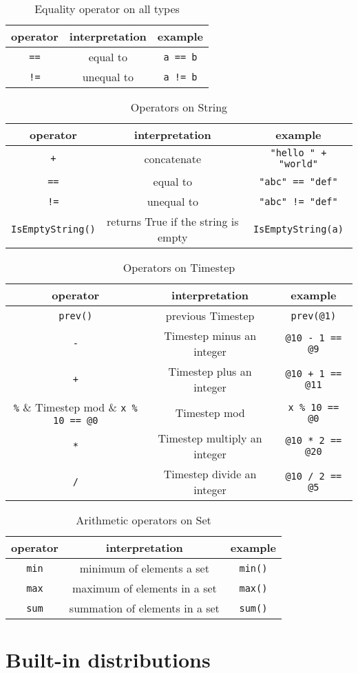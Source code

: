 \documentclass[12pt]{article}
\begin{document}
\begin{table}[H]
\centering
\caption{Equality operator on all types}
\begin{tabular}{ c c c }
\toprule 
operator & interpretation & example \\
\midrule
{\tt ==} & equal to & \verb|a == b|   \\ 
{\tt !=} & unequal to & \verb|a != b|  \\ 
\bottomrule
\end{tabular}
\end{table}

\begin{table}[H]
\centering
\caption{Operators on String}
\begin{tabular}{ c c c }
\toprule 
operator & interpretation & example \\
\midrule
{\tt +} & concatenate & \verb|"hello " + "world"|  \\ 
{\tt ==} & equal to & \verb|"abc" == "def"|  \\
{\tt !=} & unequal to & \verb|"abc" != "def"|\\ 
\verb|IsEmptyString()| & returns True if the string is empty & \verb|IsEmptyString(a)| \\
\bottomrule
\end{tabular}
\end{table}

\begin{table}[H]
\centering
\caption{Operators on Timestep}
\begin{tabular}{ c c c }
\toprule 
operator & interpretation & example \\
\midrule
\verb|prev()| & previous Timestep & \verb|prev(@1)|  \\
\verb|-| & Timestep minus an integer & \verb|@10 - 1 == @9|  \\
\verb|+| & Timestep plus an integer & \verb|@10 + 1 == @11|  \\
\verb|%| &  Timestep mod & \verb|x % 10 == @0|  \\
\verb|*| & Timestep multiply an integer & \verb|@10 * 2 == @20|  \\
\verb|/| & Timestep divide an integer & \verb|@10 / 2 == @5|  \\
\bottomrule
\end{tabular}
\end{table}

\begin{table}[H]
\centering
\caption{Arithmetic operators on Set}
\begin{tabular}{ c c c }
\toprule 
operator & interpretation & example \\
\midrule
\verb|min| & minimum of elements a set & \verb|min()|\\ 
\verb|max| & maximum of elements in a set & \verb|max()|\\
\verb|sum| & summation of elements in a set & \verb|sum()|\\ 
\bottomrule
\end{tabular}
\end{table}

\section{Built-in distributions}\label{builtin-distribution-appendix}

\end{document}
